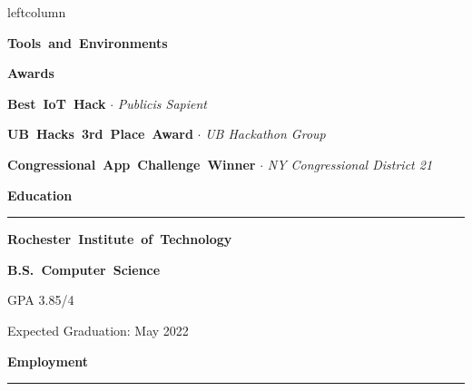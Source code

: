 \documentclass{article}
\newcommand{\rSection}[1] {
  \textcolor{header-blue} {
    \textbf{{\fontsize{0.5cm}{0.45cm}\selectfont \hbox{#1}}} \\
    \rule{0.30\textwidth}{0.1cm}
  }
}
\newcommand{\rSubSection}[1] {
  \textbf{{\fontsize{0.4cm}{0.45cm}\selectfont \hbox{#1}}}
}
\newcommand{\rSubSubSection}[1] {
  \textbf{{\fontsize{0.35cm}{0.45cm}\selectfont \hbox{#1}}}
}
\newcommand\level[2]{%
  \tikz{%
    \ifx#20
    \else
      \foreach \i in {1,...,#2} {
        \filldraw[black!20] (\i ex,0) circle (0.4ex);
      };
    \fi
    \ifx#10
    \else
      \foreach \i in {1,...,#1} {
        \filldraw[black] (\i ex,0) circle (0.4ex);
      };
    \fi
  }
}
\begin{document}
\begin{dynamiccontents*}{leftcolumn}
    \rSubSection{Tools and Environments} \par \bigskip
    \vspace{-10pt}

    \rSubSection{Awards} \par

\rSubSubSection{Best IoT Hack} $ \cdot $ \textit{Publicis Sapient} \par

\rSubSubSection{UB Hacks 3rd Place Award} $ \cdot $ \textit{UB Hackathon Group} \par

\rSubSubSection{Congressional App Challenge Winner} $ \cdot $ \textit{NY Congressional District 21} \par

\end{dynamiccontents*}

\rSection{Education} \par \bigskip
\rSubSubSection{Rochester Institute of Technology} \par
\rSubSubSection{B.S. Computer Science} \par
GPA 3.85/4 \par
Expected Graduation: May 2022 \par

\rSection{Employment} \par
\end{document}
